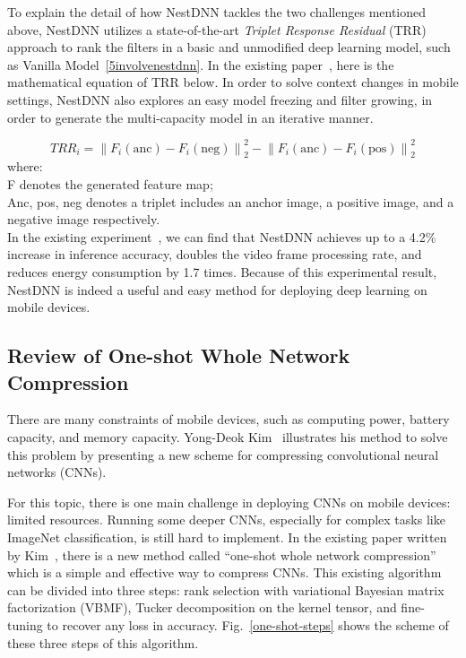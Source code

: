 \documentclass{article}
\begin{document}
To explain the detail of how NestDNN tackles the two challenges mentioned above, NestDNN utilizes a state-of-the-art \textit{Triplet Response Residual} (TRR) approach to rank the filters in a basic and unmodified deep learning model, such as Vanilla Model~\ref{5involvenestdnn}. In the existing paper~\cite{fang2018nestdnn}, here is the mathematical equation of TRR below. In order to solve context changes in mobile settings, NestDNN also explores an easy model freezing and filter growing, in order to generate the multi-capacity model in an iterative manner.	

\begin{equation}
TRR_i = \left\| F_i(\text{anc}) - F_i(\text{neg}) \right\|_2^2 - \left\| F_i(\text{anc}) - F_i(\text{pos}) \right\|_2^2
\end{equation}
where:\\
F denotes the generated feature map;\\
Anc, pos,  neg denotes a triplet includes an anchor image, a positive image, and a negative image respectively.\\

In the existing experiment~\cite{fang2018nestdnn}, we can find that NestDNN achieves up to a 4.2\% increase in inference accuracy, doubles the video frame processing rate, and reduces energy consumption by 1.7 times. Because of this experimental result, NestDNN is indeed a useful and easy method for deploying deep learning on mobile devices.


\subsection{Review of One-shot Whole Network Compression}
There are many constraints of mobile devices, such as computing power, battery capacity, and memory capacity. Yong-Deok Kim~\cite{kim2016compression} illustrates his method to solve this problem by presenting a new scheme for compressing convolutional neural networks (CNNs).

For this topic, there is one main challenge in deploying CNNs on mobile devices: limited resources. Running some deeper CNNs, especially for complex tasks like ImageNet classification, is still hard to implement. In the existing paper written by Kim~\cite{kim2016compression}, there is a new method called “one-shot whole network compression” which is a simple and effective way to compress CNNs. This existing algorithm can be divided into three steps: rank selection with variational Bayesian matrix factorization (VBMF), Tucker decomposition on the kernel tensor, and fine-tuning to recover any loss in accuracy. Fig.~\ref{one-shot-steps} shows the scheme of these three steps of this algorithm.
\end{document}
